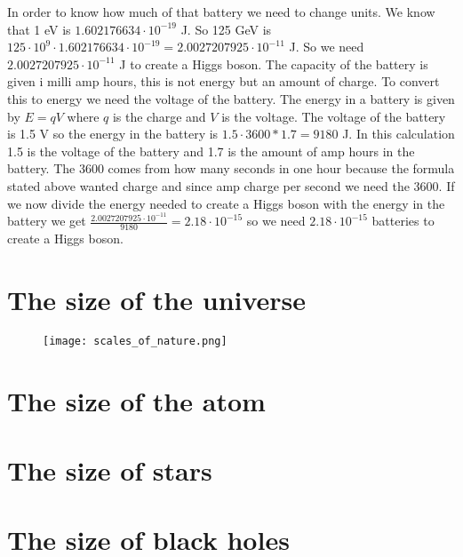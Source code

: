 \documentclass[a4paper]{article}
\begin{document}
In order to know how much of that battery we need to change units. We know that 1 eV is $1.602176634 \cdot 10^{-19}$ J. So 125 GeV is $125 \cdot 10^9 \cdot 1.602176634 \cdot 10^{-19} = 2.0027207925 \cdot 10^{-11}$ J. So we need $2.0027207925 \cdot 10^{-11}$ J to create a Higgs boson. The capacity of the battery is given i milli amp hours, this is not energy but an amount of charge. To convert this to energy we need the voltage of the battery. The energy in a battery is given by $E = qV$ where $q$ is the charge and $V$ is the voltage. The voltage of the battery is 1.5 V so the energy in the battery is $1.5 \cdot 3600 * 1.7 = 9180$ J. In this calculation 1.5 is the voltage of the battery and 1.7 is the amount of amp hours in the battery. The 3600 comes from how many seconds in one hour because the formula stated above wanted charge and since amp charge per second we need the 3600. If we now divide the energy needed to create a Higgs boson with the energy in the battery we get $\frac{2.0027207925 \cdot 10^{-11}}{9180} = 2.18 \cdot 10^{-15}$ so we need $2.18 \cdot 10^{-15}$ batteries to create a Higgs boson.
\section{The size of the universe}

\begin{figure}[H]
    \begin{small}
        \begin{center}
            \texttt{[image: scales\_of\_nature.png]}
        \end{center}
        \caption{}
        \label{fig:}
    \end{small}
\end{figure}


\section{The size of the atom}

\section{The size of stars}

\section{The size of black holes}
\end{document}
